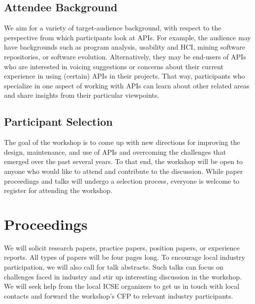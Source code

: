 \documentclass[10pt, conference]{IEEEtran}
\begin{document}
\subsection{Attendee Background} 
We aim for a variety of target-audience background, with respect to the perspective from which participants look at APIs. For example, the audience may have backgrounds such as program analysis, usability and HCI, mining software repositories, or software evolution. Alternatively, they may be end-users of APIs who are interested in voicing suggestions or concerns about their current experience in using (certain) APIs in their projects. That way, participants who specialize in one aspect of working with APIs can learn about other related areas and share insights from their particular viewpoints.

\subsection{Participant Selection}
The goal of the workshop is to come up with new directions for improving the design, maintenance, and use of APIs and overcoming the challenges that emerged over the past several years. To that end, the workshop will be open to anyone who would like to attend and contribute to the discussion. While paper proceedings and talks will undergo a selection process, everyone is welcome to register for attending the workshop. 

\section{Proceedings}

We will solicit research papers, practice papers, position papers, or experience reports. All types of papers will be four pages long. To encourage local industry participation, we will also call for talk abstracts. Such talks can focus on challenges faced in industry and stir up interesting discussion in the workshop. We will seek help from the local ICSE organizers to get us in touch with local contacts and forward the workshop's CFP to relevant industry participants.
\end{document}

